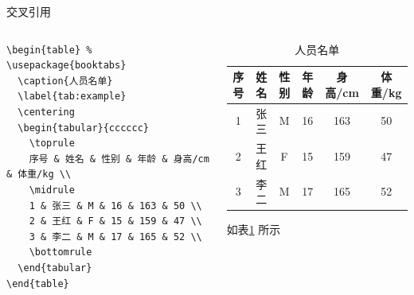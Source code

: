 \begin{frame}[fragile]{交叉引用}
  \begin{columns}
    \begin{column}{.5\textwidth} 
      \begin{verbatim}
\begin{table} % \usepackage{booktabs}
  \caption{人员名单}
  \label{tab:example}
  \centering
  \begin{tabular}{cccccc}
    \toprule
    序号 & 姓名 & 性别 & 年龄 & 身高/cm & 体重/kg \\
    \midrule
    1 & 张三 & M & 16 & 163 & 50 \\
    2 & 王红 & F & 15 & 159 & 47 \\
    3 & 李二 & M & 17 & 165 & 52 \\
    \bottomrule
  \end{tabular}
\end{table}
      \end{verbatim}
    \end{column}
    \begin{column}{.4\textwidth} \tiny
      \begin{table}[]
        \caption{人员名单}
        \label{tab:example}
        \centering
        \begin{tabular}{cccccc}
          \toprule
          序号 & 姓名 & 性别 & 年龄 & 身高/cm & 体重/kg \\
          \midrule
          1 & 张三 & M & 16 & 163 & 50 \\
          2 & 王红 & F & 15 & 159 & 47 \\
          3 & 李二 & M & 17 & 165 & 52 \\
          \bottomrule
        \end{tabular}
      \end{table}
      如表\ref{tab:example} 所示
    \end{column}
  \end{columns}
\end{frame}

